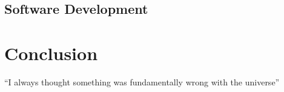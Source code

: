 \documentclass[12pt]{article}
\begin{document}
\subsection{Software Development}

\section{Conclusion}
``I always thought something was fundamentally wrong with the universe\cite{Burridge_2018a}''
{}

% 


\end{document}
